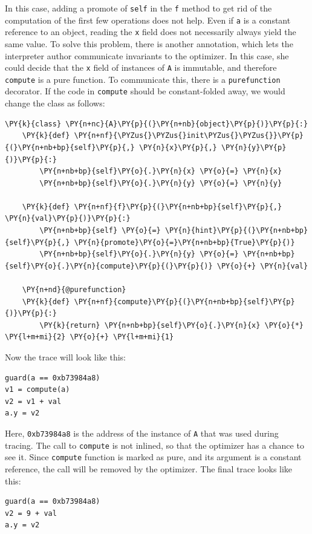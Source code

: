 \documentclass{sig-alternate}
\begin{document}
In this case, adding a promote of \texttt{self} in the \texttt{f} method to get rid of the
computation of the first few operations does not help. Even if \texttt{a} is a
constant reference to an object, reading the \texttt{x} field does not necessarily
always yield the same value. To solve this problem, there is another annotation,
which lets the interpreter author communicate invariants to the optimizer. In
this case, she could decide that the \texttt{x} field of instances of \texttt{A} is
immutable, and therefore \texttt{compute}
is a pure function. To communicate this, there is a \texttt{purefunction} decorator.
If the code in \texttt{compute} should be constant-folded away, we would change the
class as follows:
\begin{Verbatim}[commandchars=\\\{\}]
\PY{k}{class} \PY{n+nc}{A}\PY{p}{(}\PY{n+nb}{object}\PY{p}{)}\PY{p}{:}
    \PY{k}{def} \PY{n+nf}{\PYZus{}\PYZus{}init\PYZus{}\PYZus{}}\PY{p}{(}\PY{n+nb+bp}{self}\PY{p}{,} \PY{n}{x}\PY{p}{,} \PY{n}{y}\PY{p}{)}\PY{p}{:}
        \PY{n+nb+bp}{self}\PY{o}{.}\PY{n}{x} \PY{o}{=} \PY{n}{x}
        \PY{n+nb+bp}{self}\PY{o}{.}\PY{n}{y} \PY{o}{=} \PY{n}{y}

    \PY{k}{def} \PY{n+nf}{f}\PY{p}{(}\PY{n+nb+bp}{self}\PY{p}{,} \PY{n}{val}\PY{p}{)}\PY{p}{:}
        \PY{n+nb+bp}{self} \PY{o}{=} \PY{n}{hint}\PY{p}{(}\PY{n+nb+bp}{self}\PY{p}{,} \PY{n}{promote}\PY{o}{=}\PY{n+nb+bp}{True}\PY{p}{)}
        \PY{n+nb+bp}{self}\PY{o}{.}\PY{n}{y} \PY{o}{=} \PY{n+nb+bp}{self}\PY{o}{.}\PY{n}{compute}\PY{p}{(}\PY{p}{)} \PY{o}{+} \PY{n}{val}

    \PY{n+nd}{@purefunction}
    \PY{k}{def} \PY{n+nf}{compute}\PY{p}{(}\PY{n+nb+bp}{self}\PY{p}{)}\PY{p}{:}
        \PY{k}{return} \PY{n+nb+bp}{self}\PY{o}{.}\PY{n}{x} \PY{o}{*} \PY{l+m+mi}{2} \PY{o}{+} \PY{l+m+mi}{1}
\end{Verbatim}

Now the trace will look like this:
%
\begin{Verbatim}
guard(a == 0xb73984a8)
v1 = compute(a)
v2 = v1 + val
a.y = v2
\end{Verbatim}

Here, \texttt{0xb73984a8} is the address of the instance of \texttt{A} that was used
during tracing. The call to \texttt{compute} is not inlined, so that the optimizer
has a chance to see it. Since \texttt{compute} function is marked as pure, and its
argument
is a constant reference, the call will be removed by the optimizer. The final
trace looks like this:
%
\begin{Verbatim}
guard(a == 0xb73984a8)
v2 = 9 + val
a.y = v2
\end{Verbatim}
\end{document}
